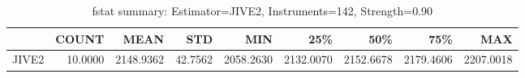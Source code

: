 \begin{table}[ht]
\centering
\caption{fstat summary: Estimator=JIVE2, Instruments=142, Strength=0.90}
\begin{tabular}{lrrrrrrrr}
\toprule
 & COUNT & MEAN & STD & MIN & 25\% & 50\% & 75\% & MAX \\
\midrule
JIVE2 & 10.0000 & 2148.9362 & 42.7562 & 2058.2630 & 2132.0070 & 2152.6678 & 2179.4606 & 2207.0018 \\
\bottomrule
\end{tabular}
\end{table}
